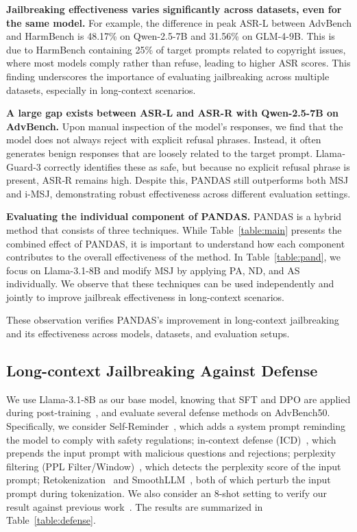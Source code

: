 \textbf{Jailbreaking effectiveness varies significantly across datasets, even for the same model.} For example, the difference in peak ASR-L between AdvBench and HarmBench is 48.17\% on Qwen-2.5-7B and 31.56\% on GLM-4-9B. This is due to HarmBench containing 25\% of target prompts related to copyright issues, where most models comply rather than refuse, leading to higher ASR scores. This finding underscores the importance of evaluating jailbreaking across multiple datasets, especially in long-context scenarios.

\textbf{A large gap exists between ASR-L and ASR-R with Qwen-2.5-7B on AdvBench.} Upon manual inspection of the model's responses, we find that the model does not always reject with explicit refusal phrases. Instead, it often generates benign responses that are  loosely related to the target prompt. Llama‐Guard‐3 correctly identifies these as safe, but because no explicit refusal phrase is present, ASR‐R remains high. Despite this, PANDAS still outperforms both MSJ and i-MSJ, demonstrating robust effectiveness across different evaluation settings.


\textbf{Evaluating the individual component of PANDAS.} PANDAS is a hybrid method that consists of three techniques. While Table~\ref{table:main} presents the combined effect of PANDAS, it is important to understand how each component contributes to the overall effectiveness of the method. In Table~\ref{table:pand}, we focus on Llama-3.1-8B and modify MSJ by applying PA, ND, and AS individually. We observe that these techniques can be used independently and jointly to improve jailbreak effectiveness in long-context scenarios.

These observation verifies PANDAS’s improvement in long-context jailbreaking and its effectiveness across models, datasets, and evaluation setups.

\subsection{Long-context Jailbreaking Against Defense}

We use Llama-3.1-8B as our base model, knowing that SFT and DPO are applied during post-training~\citep{dubey2024llama}, and evaluate several defense methods on AdvBench50.
Specifically, we consider 
Self-Reminder~\citep{xie2023defending}, which adds a system prompt reminding the model to comply with safety regulations; 
in-context defense (ICD)~\citep{wei2023jailbreak}, which prepends the input prompt with malicious questions and rejections; 
perplexity filtering (PPL Filter/Window)~\citep{jain2023baseline}, which detects the perplexity score of the input prompt; 
Retokenization~\citep{jain2023baseline} and SmoothLLM~\citep{robey2023smoothllm}, both of which perturb the input prompt during tokenization. 
We also consider an 8-shot setting to verify our result against previous work~\citep{zheng2024improved}. The results are summarized in Table~\ref{table:defense}.


